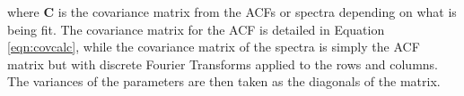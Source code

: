 \documentclass[draft,ras]{agutex}
\begin{document}
\begin{article}
\noindent where $ \mathbf{C}$ is the covariance matrix from the ACFs or spectra depending on what is being fit. The covariance matrix for the ACF is detailed in Equation \ref{eqn:covcalc}, while the covariance matrix of the spectra is simply the ACF matrix but with discrete Fourier Transforms applied to the rows and columns. The variances of the parameters are then taken as the diagonals of the matrix.


%
%







\end{article}
\end{document}
